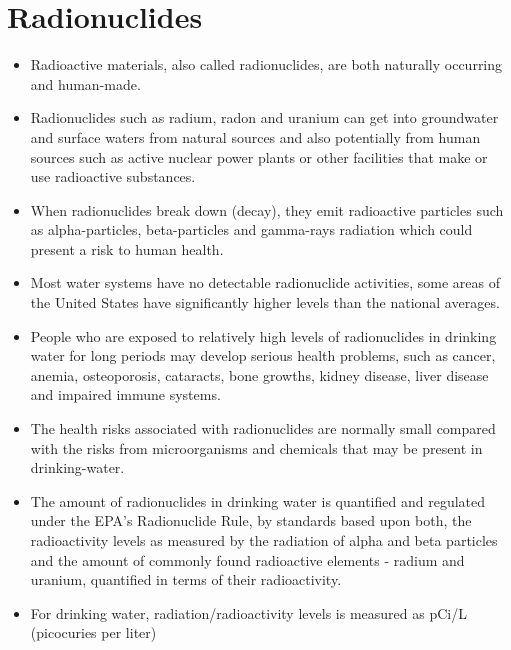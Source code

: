 \section{Radionuclides}
\begin{itemize}
\item Radioactive materials, also called radionuclides, are both naturally occurring and human-made.

\item Radionuclides such as radium, radon and uranium can get into groundwater and surface waters from natural sources and also potentially from human sources such as active nuclear power plants or other facilities that make or use radioactive substances.

\item When radionuclides break down (decay), they emit radioactive particles such as alpha-particles, beta-particles and gamma-rays radiation which could present a risk to human health.

\item Most water systems have no detectable radionuclide activities, some areas of the United
States have significantly higher levels than the national averages.

\item People who are exposed to relatively high levels of radionuclides in drinking water for long periods may develop serious health problems, such as cancer, anemia, osteoporosis, cataracts, bone growths, kidney disease, liver disease and impaired immune systems.

\item The health risks associated with radionuclides are normally small compared with the risks from microorganisms and chemicals that may be present in drinking-water. 

\item The amount of radionuclides in drinking water is quantified and regulated under the EPA's Radionuclide Rule, by standards based upon both, the radioactivity levels as measured by the radiation of alpha and beta particles and the amount of commonly found radioactive elements - radium and uranium, quantified in terms of their radioactivity.
\item For drinking water, radiation/radioactivity levels is measured as pCi/L (picocuries per liter)
\end{itemize}



